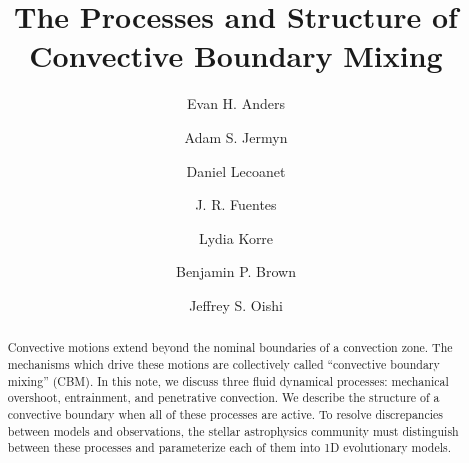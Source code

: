 \documentclass[linenumbers]{aastex631}
\begin{document}
\title{The Processes and Structure of Convective Boundary Mixing}
\author[0000-0002-3433-4733]{Evan H. Anders}
\author[0000-0001-5048-9973]{Adam S. Jermyn}
\author[0000-0002-7635-9728]{Daniel Lecoanet}
\author[0000-0003-2124-9764]{J. R. Fuentes}
\author[0000-0002-0963-4881]{Lydia Korre}
\author[0000-0001-8935-219X]{Benjamin P. Brown}
\author[0000-0001-8531-6570]{Jeffrey S. Oishi}


\begin{abstract}
    Convective motions extend beyond the nominal boundaries of a convection zone.
    The mechanisms which drive these motions are collectively called ``convective boundary mixing'' (CBM).
    In this note, we discuss three fluid dynamical processes: mechanical overshoot, entrainment, and penetrative convection.
    We describe the structure of a convective boundary when all of these processes are active.
    To resolve discrepancies between models and observations, the stellar astrophysics community must distinguish between these processes and parameterize each of them into 1D evolutionary models.
\end{abstract}



\end{document}
